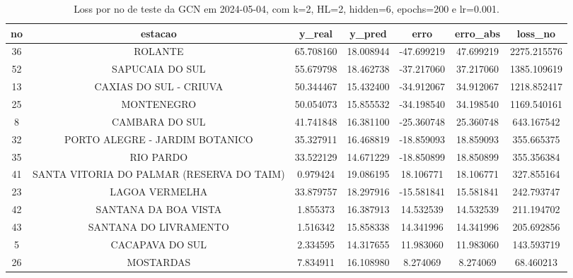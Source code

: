 \begin{table}[h]
\centering
\caption{Loss por no de teste da GCN em 2024-05-04, com k=2, HL=2, hidden=6, epochs=200 e lr=0.001.}
\label{tab:gcn_loss_k2_hl2_h6_e200_d20240504}
\begin{tabular}{ccccccc}
\toprule
no & estacao & y\_real & y\_pred & erro & erro\_abs & loss\_no \\
\midrule
36 & ROLANTE & 65.708160 & 18.008944 & -47.699219 & 47.699219 & 2275.215576 \\
52 & SAPUCAIA DO SUL & 55.679798 & 18.462738 & -37.217060 & 37.217060 & 1385.109619 \\
13 & CAXIAS DO SUL - CRIUVA & 50.344467 & 15.432400 & -34.912067 & 34.912067 & 1218.852417 \\
25 & MONTENEGRO & 50.054073 & 15.855532 & -34.198540 & 34.198540 & 1169.540161 \\
8 & CAMBARA DO SUL & 41.741848 & 16.381100 & -25.360748 & 25.360748 & 643.167542 \\
32 & PORTO ALEGRE - JARDIM BOTANICO & 35.327911 & 16.468819 & -18.859093 & 18.859093 & 355.665375 \\
35 & RIO PARDO & 33.522129 & 14.671229 & -18.850899 & 18.850899 & 355.356384 \\
41 & SANTA VITORIA DO PALMAR (RESERVA DO TAIM) & 0.979424 & 19.086195 & 18.106771 & 18.106771 & 327.855164 \\
23 & LAGOA VERMELHA & 33.879757 & 18.297916 & -15.581841 & 15.581841 & 242.793747 \\
42 & SANTANA DA BOA VISTA & 1.855373 & 16.387913 & 14.532539 & 14.532539 & 211.194702 \\
43 & SANTANA DO LIVRAMENTO & 1.516342 & 15.858338 & 14.341996 & 14.341996 & 205.692856 \\
5 & CACAPAVA DO SUL & 2.334595 & 14.317655 & 11.983060 & 11.983060 & 143.593719 \\
26 & MOSTARDAS & 7.834911 & 16.108980 & 8.274069 & 8.274069 & 68.460213 \\
\bottomrule
\end{tabular}
\end{table}
